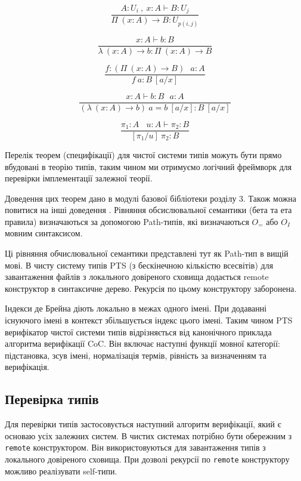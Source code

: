 \begin{equation}
\tag{$\Pi$-formation}
\dfrac
{A:U_i\ ,\ x:A \vdash B : U_j}
{\Pi\ (x:A) \rightarrow B : U_{p(i,j)}}
\end{equation}

\begin{equation}
\tag{$\lambda$-intro}
\dfrac
{x:A \vdash b : B}
{\lambda\ (x:A) \rightarrow b : \Pi\ (x: A) \rightarrow B }
\end{equation}

\begin{equation}
\tag{$App$-elimination}
\dfrac
{f: (\Pi\ (x:A) \rightarrow B)\ \ \ a: A}
{f\ a : B\ [a/x]}
\end{equation}

\begin{equation}
\tag{$\beta$-computation}
\dfrac
{x:A \vdash b: B\ \ \ a:A}
{(\lambda\ (x:A) \rightarrow b)\ a = b\ [a/x] : B\ [a/x]}
\end{equation}

\begin{equation}
\tag{subst}
\dfrac
{\pi_1 : A\ \ \ \ u:A \vdash \pi_2 : B}
{[\pi_1/u]\ \pi_2 : B}
\end{equation}

Перелік теорем (специфікації) для чистої системи типів можуть бути
прямо вбудовані в теорію типів, таким чином ми отримуємо логічний фреймворк
для перевірки імплементації залежної теорії.

Доведення цих теорем дано в модулі базової бібліотеки розділу 3.
Також можна повитися на інші доведення \cite{Henk93}.
Рівняння обсислювальної семантики (бета та ета правила) визначаються
за допомогою Path-типів, які визначаються $O_=$ або $O_I$ мовним синтаксисом.

Ці рівняння обчислювальної семантики представлені тут як Path-тип в вищій мові.
В чисту систему типів PTS (з бескінечною кількістю всесвітів)
для завантаження файлів з локального довіреного сховища додається
remote конструктор в синтаксичне дерево. Рекурсія по цьому конструктору заборонена.

Індекси де Брейна діють локально в межах одного імені.
При додаванні існуючого імені в контекст збільшується індекс цього імені.
Таким чином PTS верифікатор чистої системи типів відрізняється від
канонічного приклада алгоритма верифікації CoC\cite{Coq88}. Він включає
наступні функції мовної категорії: підстановка,
зсув імені, нормалізація термів, рівність
за визначенням та верифікація.

\subsection*{Перевірка типів}
Для перевірки типів застосовується наступний алгоритм верифікації, який є основаю
усіх залежних систем. В чистих системах потрібно бути обережним з \lstinline{remote}
конструктором. Він використовуються для завантаження типів з локального довіреного сховища.
При дозволі рекурсії по \lstinline{remote} конструктору можливо реалізувати
self-типи\cite{Stump17}\cite{Fu14}.

